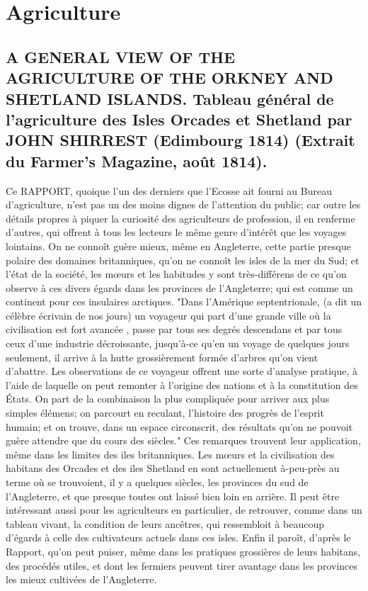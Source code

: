 \setcounter{page}{386}
\chapter{Agriculture}
\section{A GENERAL VIEW OF THE AGRICULTURE OF THE ORKNEY AND SHETLAND ISLANDS. \large{Tableau général de l'agriculture des Isles Orcades et Shetland par JOHN SHIRREST (Edimbourg 1814) (Extrait du Farmer's Magazine, août 1814).}}
Ce RAPPORT, quoique l'un des derniers que l'Ecosse ait fourni au Bureau d'agriculture, n'est pas un des moins dignes de l'attention du public; car outre les détails propres à piquer la curiosité des agriculteurs de profession, il en renferme d'autres, qui offrent à tous les lecteurs le même genre d'intérêt que les voyages lointains. On ne connoît guère mieux, même en Angleterre, cette partie presque polaire des domaines britanniques, qu'on ne connoît les isles de la mer du Sud; et l'état de la société, les mœurs et les habitudes y sont très-différens de ce qu'on observe à ces divers égards dans les provinces de l'Angleterre; qui est comme un continent pour ces\setcounter{page}{387} insulaires arctiques. "Dans l'Amérique septentrionale, (a dit un célèbre écrivain de nos jours) un voyageur qui part d'une grande ville où la civilisation est fort avancée , passe par tous ses degrés descendans et par tous ceux d'une industrie décroissante, jusqu'à-ce qu'en un voyage de quelques jours seulement, il arrive à la hutte grossièrement formée d'arbres qu'on vient
d'abattre. Les observations de ce voyageur offrent une sorte d'analyse pratique, à l'aide de laquelle on peut remonter à l'origine des nations et à la constitution des États.
On part de la combinaison la plus compliquée pour arriver aux plus simples élémens; on parcourt en reculant, l'histoire des progrès de l'esprit humain; et on trouve, dans un espace circonscrit, des résultats qu'on ne pouvoit guère attendre que du cours des siècles."
Ces remarques trouvent leur application, même dans les limites des iles britanniques. Les mœurs et la civilisation des habitans des Orcades et des iles Shetland en sont actuellement à-peu-près au terme où se trouvoient, il y a quelques siècles, les provinces du sud de l'Angleterre, et que presque toutes ont laissé bien loin en arrière. Il peut être intéressant aussi pour les agriculteurs en particulier,\setcounter{page}{388} de retrouver, comme dans un tableau vivant, la condition de leurs ancêtres, qui ressembloit à beaucoup d'égards à celle des cultivateurs actuels dans ces isles. Enfin il paroît, d'après le Rapport, qu'on peut puiser, même dans les pratiques grossières de leurs habitans, des procédés utiles, et dont les fermiers peuvent tirer avantage dans les provinces les mieux cultivées de l'Angleterre.
